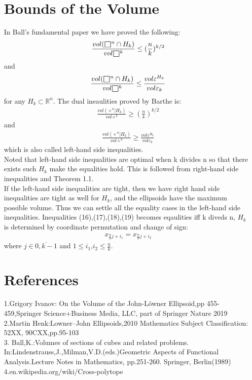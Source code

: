 \documentclass[fontsize=12pt,a4paper]{article}
\def\msquare{\mathord{\scalerel*{\Box}{gX}}}
\begin{document}
\section{Bounds of the Volume}

In Ball's fundamental paper we have proved the following:\\
\begin{align}
    \frac{vol(\msquare{}^n \cap H_k)}{vol\msquare{}^k} \leq (\frac{n}{k})^{k/2}
\end{align}
and
\begin{align}
    \frac{vol(\msquare{}^n \cap H_k)}{vol\msquare{}^k} \leq \frac{vol \varepsilon^{H_k}}{vol\varepsilon_k}
\end{align}
for any $H_k \subset \mathbb{R}^n$. The dual ineaulities proved by Barthe is:
\begin{align}
    \frac{vol(\diamond{}^n| H_k)}{vol\diamond{}^k} \geq (\frac{n}{k})^{k/2}
\end{align}
and
\begin{align}
    \frac{vol(\diamond{}^n | H_k)}{vol\diamond{}^k} \geq \frac{vol \varepsilon^{H_k}}{vol\varepsilon_k}
\end{align}
which is also called left-hand side inequalities.\\

Noted that left-hand side inequalities are optimal when k divides n so that there exists such $H_k$ make the equalities hold. This is followed from right-hand side inequalities and Theorem 1.1.\\
If the left-hand side inequalities are tight, then we have right hand side inequalities are tight as well for $H_k$, and the ellipsoids have the maximum possible volume. Thus we can settle all the equality cases in the left-hand side inequalities.
Inequalities (16),(17),(18),(19) becomes eqaulities iff k diveds n, $H_k$ is determined by coordinate permutation and change of sign:
\begin{align}
    x_{\frac{n}{k}j+i_1} =  x_{\frac{n}{k}j+i_2}
\end{align}
where $j \in \overline{0,k-1}$ and $1\leq i_1$,$i_2 \leq \frac{n}{k}$.

\section{References}
1.Grigory Ivanov: On the Volume of the John-Löwner Ellipsoid,pp 455-459,Springer Science+Business Media, LLC, part of Springer Nature 2019\\
2.Martin Henk:Lowner–John Ellipsoids,2010 Mathematics Subject Classification: 52XX, 90CXX,pp.95-103\\
3. Ball,K.:Volumes of sections of cubes and related problems. In:Lindenstrauss,J.,Milman,V.D.(eds.)Geometric Aspects of Functional Analysis.Lecture Notes in Mathematics, pp.251-260. Springer, Berlin(1989)\\
4.en.wikipedia.org/wiki/Cross-polytope
\end{document}
